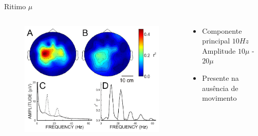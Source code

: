 \documentclass{beamer}
\begin{document}
\begin{frame}{Ritimo $\mu$}
    \begin{columns}
        \begin{column}{0.5\textwidth}
           \begin{center}
               \begin{figure}
                   \centering
                   \includegraphics[scale=0.25]{Images/ERDmu.PNG}
                   \caption{\cite{BCI2000}}
                   \label{fig:Estagio_BCI}
               \end{figure}
           \end{center}
         \end{column}
         \begin{column}{0.5\textwidth}
            \begin{itemize}
                \item Componente principal $10Hz$ Amplitude $10\mu$ - $20\mu$
                \item Presente na aus\^encia de movimento
            \end{itemize}
         \end{column}
    \end{columns}               
\end{frame}
\end{document}
